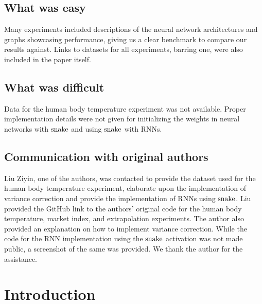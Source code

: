 \subsection*{What was easy}

Many experiments included descriptions of the neural network architectures and graphs showcasing performance, giving us a clear benchmark to compare our results against. Links to datasets for all experiments, barring one, were also included in the paper itself.

\subsection*{What was difficult}

Data for the human body temperature experiment was not available. Proper implementation details were not given for initializing the weights in neural networks with \( \operatorname{snake} \) and using \( \operatorname{snake} \) with RNNs.

\subsection*{Communication with original authors}

Liu Ziyin, one of the authors, was contacted to provide the dataset used for the human body temperature experiment, elaborate upon the implementation of variance correction and provide the implementation of RNNs using $ \operatorname{snake} $. Liu provided the GitHub link to the authors' original code for the human body temperature, market index, and extrapolation experiments. The author also provided an explanation on how to implement variance correction. While the code for the RNN implementation using the \(  \operatorname{snake} \) activation was not made public, a screenshot of the same was provided. We thank the author for the assistance.

\section{Introduction}

